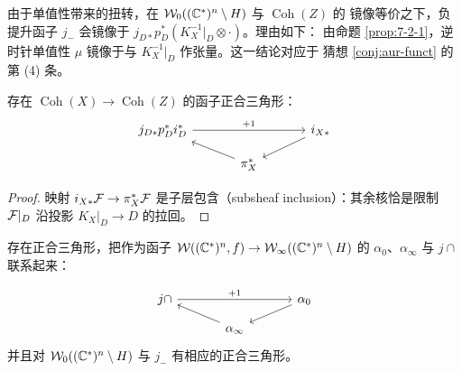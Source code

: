 

\begin{remarkx}
由于单值性带来的扭转，在 $\mathcal{W}_0((\mathbb{C}^*)^n\setminus H)$ 与 $\operatorname{Coh}(Z)$ 的
镜像等价之下，负提升函子 $j_-$ 会镜像于 $j_{D*}p_D^*(K_X^{-1}|_D\otimes\cdot)$。理由如下：
由命题 \ref{prop:7-2-1}，逆时针单值性 $\mu$ 镜像于与 $K_X^{-1}|_D$ 作张量。这一结论对应于
猜想 \ref{conj:aur-funct} 的第 (4) 条。
\end{remarkx}


\begin{lemma}\label{lem:9-0-3}
存在 $\operatorname{Coh}(X)\to\operatorname{Coh}(Z)$ 的函子正合三角形：
\[
\begin{tikzcd}[row sep=1.0em, column sep=3.4em]
{j_{D*}p_D^*i_D^*} \arrow[rr,"+1"] & & i_{X*} \arrow[dl] \\
& \pi_X^* \arrow[ul] &
\end{tikzcd}
\]
\end{lemma}

\begin{proof}
映射 $i_{X*}\mathcal{F}\to\pi_X^*\mathcal{F}$ 是子层包含（subsheaf inclusion）：其余核恰是限制 $\mathcal{F}|_D$ 沿投影
$K_X|_D\to D$ 的拉回。
\end{proof}


\begin{corollary}\label{cor:9-0-4}
存在正合三角形，把作为函子 $\mathcal{W}((\mathbb{C}^*)^n,f)\to\mathcal{W}_\infty((\mathbb{C}^*)^n\setminus H)$ 的
$\alpha_0$、$\alpha_\infty$ 与 $j\cap$ 联系起来：


\[
\begin{tikzcd}[row sep=1.0em, column sep=3.4em]
{j\cap} \arrow[rr,"+1"] & & \alpha_0 \arrow[dl] \\
& \alpha_\infty \arrow[ul] &
\end{tikzcd}
\]
并且对 $\mathcal{W}_0((\mathbb{C}^*)^n\setminus H)$ 与 $j_-$ 有相应的正合三角形。
\end{corollary}


